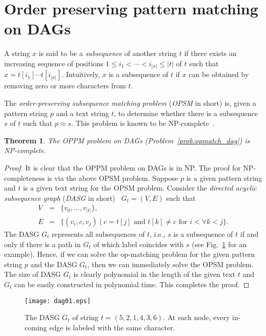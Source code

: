 \documentclass[a4paper,11pt]{article}
\newtheorem{theorem}{Theorem}
\begin{document}


\section{Order preserving pattern matching on DAGs}

A string $x$ is said to be a \emph{subsequence} of
another string $t$ if there exists an increasing
sequence of positions $1 \leq i_1 < \cdots < i_{|x|} \leq |t|$
of $t$ such that $x = t[i_1] \cdots t[i_{|x|}]$.
Intuitively, $x$ is a subsequence of $t$
if $x$ can be obtained by removing zero or more characters from $t$.

The \emph{order-preserving subsequence matching problem}
(\emph{OPSM} in short) is,
given a pattern string $p$ and a text string $t$,
to determine whether there is a subsequence $s$ of $t$
such that $p \approx s$.
This problem is known to be NP-complete~\cite{BoseBL98}.

\begin{theorem}
  The OPPM problem on DAGs (Problem~\ref{prob:opmatch_dag}) is NP-complete.
\end{theorem}

\begin{proof}
  It is clear that the OPPM problem on DAGs is in NP.
  The proof for NP-completeness is via the above OPSM problem.
  Suppose $p$ is a given pattern string
  and $t$ is a given text string for the OPSM problem.
  Consider the \emph{directed acyclic subsequence graph}
  (\emph{DASG} in short)~\cite{Baeza-Yates91} $G_t = (V, E)$
  such that
  \begin{eqnarray*}
    V & = & \{v_0, \ldots, v_{|t|}\}, \\
    E & = & \{(v_i, c, v_j) \mid c = t[j] \mbox{ and } t[k]\neq c \mbox{ for } i < \forall k < j \}.
  \end{eqnarray*}
  The DASG $G_t$ represents all subsequences of $t$,
  i.e., $s$ is a subsequence of $t$ if and only if
  there is a path in $G_t$ of which label coincides with $s$
  (see Fig.~\ref{fig:dasg} for an example).
  Hence, if we can solve the op-matching problem
  for the given pattern string $p$ and the DASG $G_t$,
  then we can immediately solve the OPSM problem.
  The size of DASG $G_t$ is clearly polynomial
  in the length of the given text $t$
  and $G_t$ can be easily constructed in polynomial time.
  This completes the proof.
\end{proof}

\begin{figure}[tb] 
 \centerline{
 \texttt{[image: dag01.eps]}
 }
 \caption{The DASG $G_t$ of string $t = (5, 2, 1, 4, 3, 6)$. At each node, every in-coming edge is labeled with the same character.}
\label{fig:dasg}
\end{figure}
\end{document}
